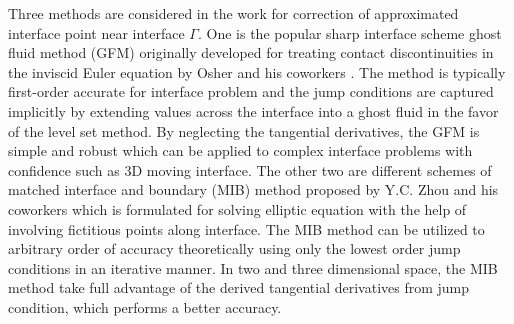 \documentclass[dissertation]{uathesis}
\begin{document}
\begin{body}
Three methods are considered in the work for correction of approximated interface point near interface $\Gamma$. One is the popular sharp interface scheme ghost fluid method (GFM) originally developed for treating contact discontinuities in the inviscid Euler equation by Osher and his coworkers \cite{fedkiw1999non}. The method is typically first-order accurate for interface problem and the jump conditions are captured implicitly by extending values across the interface into a ghost fluid in the favor of the level set method. By neglecting the tangential derivatives, the GFM is simple and robust which can be applied to complex interface problems  with confidence such as 3D moving interface. The other two are different schemes of matched interface and boundary (MIB) method proposed by Y.C. Zhou and his coworkers \cite{zhou2006high} which is formulated for solving elliptic equation with the help of involving fictitious points along interface. The MIB method can be utilized to arbitrary order of accuracy theoretically using only the lowest order jump conditions in an iterative manner. In two and three dimensional space, the MIB method take full advantage of the derived tangential derivatives from jump condition, which performs a better accuracy.
%
\begin{figure}[!ht]
	\begin{center}
\end{center}
\end{figure}
\end{body}
\end{document}
